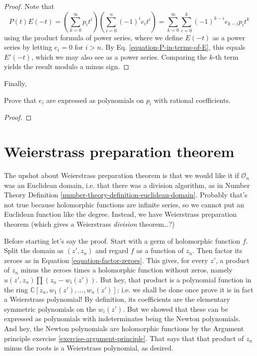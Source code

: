 \begin{proof}
Note that
$$
P(t)E(-t)=\left(\sum_{k=0}^{\infty} p_it^i\right)
\left(\sum_{i=0}^n(-1)^ie_it^i\right)
=\sum_{k=0}^\infty \sum_{i=0}^k (-1)^{k-i}e_{k-i}p_it^k
$$
using the product formula of power series, where we define $E(-t)$ as a power
series by letting $e_i=0$ for $i>n$. By Eq. \ref{equation-P-in-terms-of-E}, this
equals $E'(-t)$, which we may also see as a power series. Comparing the $k$-th
term yields the result modulo a minus sign.
\end{proof}

\noindent
Finally,

\begin{exercise}
\label{exercise-symmetric-polynomials-in-terms-of-newton-polynomials}
Prove that $e_i$ are expressed as polynomials on $p_i$ with rational
coefficients.
\end{exercise}

\begin{proof}

\end{proof}

\section{Weierstrass preparation theorem}
\label{section-weierstrass-preparation-theorem}

\noindent
The upshot about Weierstrass preparation theorem is that
we would like it if $\mathcal{O}_n$ was an Euclidean domain,
i.e. that there was a division algorithm, 
as in Number Theory Definition \ref{number-theory-definition-euclidean-domain}.
Probably that's not true because
holomorphic functions are infinite series,
so we cannot put an Euclidean function like the degree.
Instead, we have Weierstrass preparation theorem
(which gives a Weierstrass {\it division} theorem…?)

\medskip\noindent
Before starting let's say the proof.
Start with a germ of holomorphic function $f$.
Split the domain as $(z',z_n)$ and regard $f$
as a function of $z_n$. 
Then factor its zeroes 
as in Equation \ref{equation-factor-zeroes}.
This gives, for every $z'$, 
a product of $z_n$ minus the zeroes times a holomorphic function
without zeros, namely $u(z',z_n)\prod (z_n-w_i(z'))$.
But hey, that product is a polynomial function in the ring
$\mathbb{C}[z_n,w_1(z'),\ldots,w_n(z')]$; i.e.
we shall be done once prove it is in fact a Weierstrass polynomial!
By definition, its coefficients are the 
elementary symmetric polynomials on the $w_i(z')$.
But we showed that these can be expressed as polynomials
with indeterminates being the Newton polynomials.
And hey, the Newton polynomials are holomorphic functions
by the Argument principle exercise \ref{exercise-argument-principle}.
That says that that product of $z_n$ minus the roots
is a Weierstrass polynomial, as desired.


